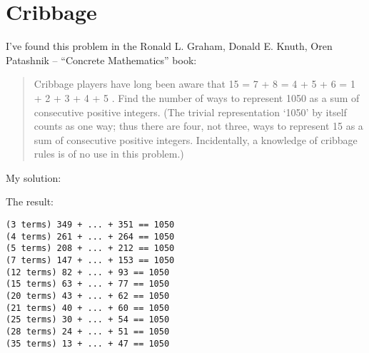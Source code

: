 \section{Cribbage}

I've found this problem in the Ronald L. Graham, Donald E. Knuth, Oren Patashnik -- ``Concrete Mathematics'' book:

\begin{framed}
\begin{quotation}
Cribbage players have long been aware that 15 = 7 + 8 = 4 + 5 + 6 =
1 + 2 + 3 + 4 + 5 . Find the number of ways to represent 1050 as a sum of
consecutive positive integers. (The trivial representation `1050' by itself
counts as one way; thus there are four, not three, ways to represent 15
as a sum of consecutive positive integers. Incidentally, a knowledge of
cribbage rules is of no use in this problem.)
\end{quotation}
\end{framed}

My solution:



The result:

\begin{lstlisting}
(3 terms) 349 + ... + 351 == 1050
(4 terms) 261 + ... + 264 == 1050
(5 terms) 208 + ... + 212 == 1050
(7 terms) 147 + ... + 153 == 1050
(12 terms) 82 + ... + 93 == 1050
(15 terms) 63 + ... + 77 == 1050
(20 terms) 43 + ... + 62 == 1050
(21 terms) 40 + ... + 60 == 1050
(25 terms) 30 + ... + 54 == 1050
(28 terms) 24 + ... + 51 == 1050
(35 terms) 13 + ... + 47 == 1050
\end{lstlisting}

